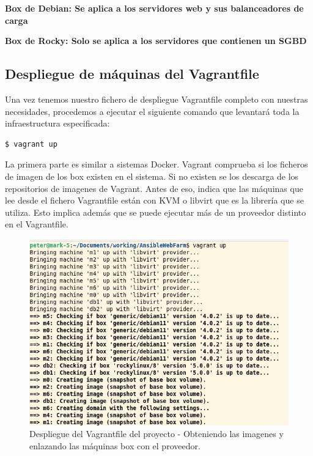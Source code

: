 \textbf{Box de Debian: Se aplica a los servidores web y sus balanceadores de carga}

\vspace{5mm}

\textbf{Box de Rocky: Solo se aplica a los servidores que contienen un SGBD}


\newpage
\subsection{Despliegue de máquinas del Vagrantfile}

Una vez tenemos nuestro fichero de despliegue Vagrantfile completo con nuestras necesidades, procedemos a ejecutar el siguiente comando que levantará toda la infraestructura especificada:

\begin{lstlisting}[style=mybash]
$ vagrant up
\end{lstlisting}

La primera parte es similar a sistemas Docker. Vagrant comprueba si los ficheros de imagen de los box existen en el sistema. Si no existen se los descarga de los repositorios de imagenes de Vagrant.
Antes de eso, indica que las máquinas que lee desde el fichero Vagrantfile están con KVM o libvirt que es la librería que se utiliza. Esto implica además que se puede ejecutar más de un proveedor distinto en el Vagrantfile.

\begin{figure}[H]
	\centering
	\includegraphics[scale=0.35]{img/vagrant2}
	\caption{Despliegue del Vagrantfile del proyecto - Obteniendo las imagenes y enlazando las máquinas box con el proveedor.}
\end{figure}

